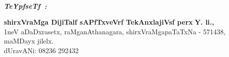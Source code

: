 ~
\thispagestyle{empty}
\vfill


\noindent
{\sl\bfseries TeYpfseTf~:}
\medskip

\noindent
{\bf shirxVraMga DijiTalf sAPfTxveVrf TekAnxlajiVsf perx$\;$Y. li.,}\\[3pt]
{\rm 1}neV aDaDxrasetx, raMganAthanagara, shirxVraMgapaTaTxNa - {\rm 571438},\\[3pt]
maMDayx jilelx.\\[4pt]
dUravANi: {\rm 08236 292432}
